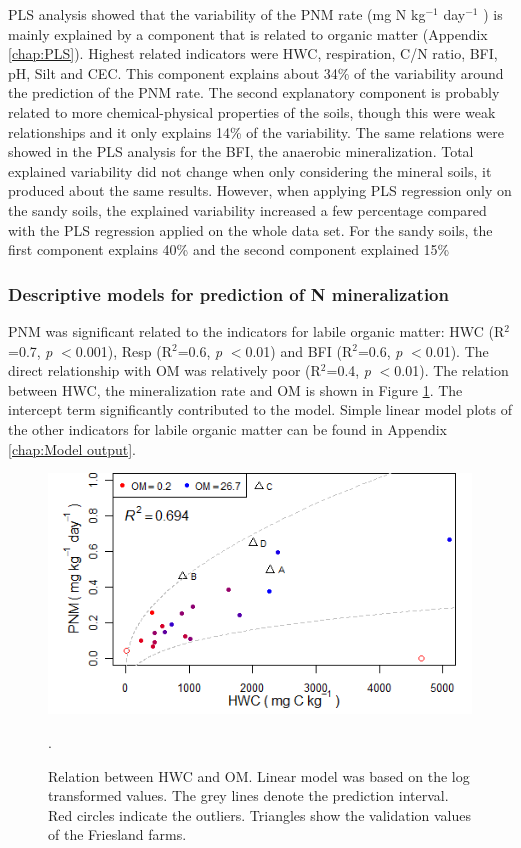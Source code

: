 \documentclass[10pt,twoside,dutch,english]{report}
\begin{document}
PLS analysis showed that the variability of the PNM rate (mg N kg$^{-1} $ day$^{-1}$ ) is mainly explained by a component that is related to organic matter (Appendix \ref{chap:PLS}). Highest related indicators were HWC, respiration, C/N ratio, BFI, pH, Silt and CEC. This component explains about 34\% of the variability around the prediction of the PNM rate. The second explanatory component is probably related to more chemical-physical properties of the soils, though this were weak relationships and it only explains 14\% of the variability. The same relations were showed in the PLS analysis for the BFI, the anaerobic mineralization. Total explained variability did not change when only considering the mineral soils, it produced about the same results. However, when applying PLS regression only on the sandy soils, the explained variability increased a few percentage compared with the PLS regression applied on the whole data set. For the sandy soils, the first component explains 40\% and the second component explained 15\% 


\subsubsection{Descriptive models for prediction of N mineralization}
PNM was significant related to the indicators for labile organic matter: HWC (R$^{2}$=0.7, \textit{p} $<$0.001), Resp (R$^{2}$=0.6, \textit{p} $<$0.01) and BFI (R$^{2}$=0.6, \textit{p} $<$0.01). The direct relationship with OM was relatively poor (R$^{2}$=0.4, \textit{p} $<$0.01). The relation between HWC, the mineralization rate and OM is shown in Figure \ref{fig:results_pnm_hwc}. The intercept term significantly contributed to the model.  Simple linear model plots of the other indicators for labile organic matter can be found in Appendix \ref{chap:Model output}.

	\begin{figure}[h] %
	\centering
	\includegraphics[width=0.7\linewidth]{results_pnm_hwc}
	\caption{Relation between HWC and OM. Linear model was based on the log transformed values. The grey lines denote the prediction interval. Red circles indicate the outliers. Triangles show the validation values of the Friesland farms.}.
	\label{fig:results_pnm_hwc}
\end{figure}
\end{document}
